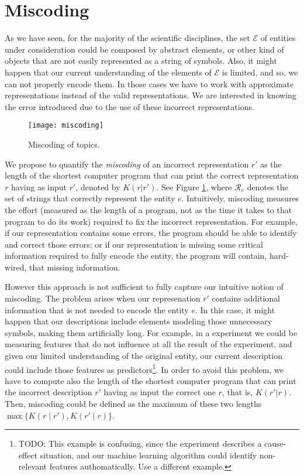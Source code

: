 %
%

\section{Miscoding}
\label{sec:ch1_miscoding}

As we have seen, for the majority of the scientific disciplines, the set $\mathcal{E}$ of entities under consideration could be composed by abstract elements, or other kind of objects that are not easily represented as a string of symbols. Also, it might happen that our current understanding of the elements of $\mathcal{E}$ is limited, and so, we can not properly encode them. In those cases we have to work with approximate representations instead of the valid representations. We are interested in knowing the error introduced due to the use of these incorrect representations.

\begin{figure}[h]
\centering\texttt{[image: miscoding]}
\caption{\label{fig:miscoding}Miscoding of topics.}
\end{figure}

We propose to quantify the \emph{miscoding} of an incorrect representation $r'$ as the length of the shortest computer program that can print the correct representation $r$ having as input $r'$, denoted by $K(r|r')$. See Figure \ref{fig:miscoding}, where $\mathcal{R}_e$ denotes the set of strings that correctly represent the entity $e$. Intuitively, miscoding measures the effort (measured as the length of a program, not as the time it takes to that program to do its work) required to fix the incorrect representation. For example, if our representation contains some errors, the program should be able to identify and correct those errors; or if our representation is missing some critical information required to fully encode the entity, the program will contain, hard-wired, that missing information.

However this approach is not sufficient to fully capture our intuitive notion of miscoding. The problem arises when our represenation $r'$ contains additional information that is not needed to encode the entity $e$. In this case, it might happen that our descriptions include elements modeling those unnecessary symbols, making them artificially long. For example, in a experiment we could be measuring features that do not influence at all the result of the experiment, and given our limited understanding of the original entity, our current description could include those features as predictors\footnote{\color{red} TODO: This example is confusing, since the experiment describes a cause-effect situation, and our machine learning algorithm could identify non-relevant features authomatically. Use a different example.}. In order to avoid this problem, we have to compute also the length of the shortest computer program that can print the incorrect description $r'$ having as input the correct one $r$, that is, $K(r'|r)$. Then, miscoding could be defined as the maximum of these two lengths $\max\{ K(r \mid r'), K(r' \mid r)\}$.

